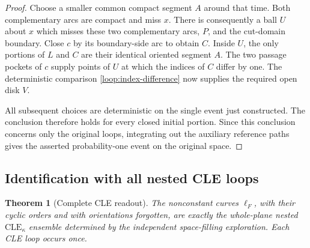 \documentclass[11pt]{article}
\numberwithin{equation}{section}
\newtheorem{theorem}{Theorem}[section]
\theoremstyle{definition}
\theoremstyle{remark}
\newcommand{\1}{\mathbf 1}
\begin{document}
\begin{proof}
Choose a smaller common compact segment $A$ around that time.  Both
complementary arcs are compact and miss $x$.  There is consequently a
ball $U$ about $x$ which misses these two complementary arcs, $P$, and
the cut-domain boundary.  Close $c$ by its boundary-side arc to obtain
$C$.  Inside $U$, the only portions of $L$ and $C$ are their identical
oriented segment $A$.  The two passage pockets of $c$ supply points
of $U$ at which the indices of $C$ differ by one.  The deterministic
comparison \eqref{loop:index-difference} now supplies the required
open disk $V$.

All subsequent choices are deterministic on the single event just
constructed.  The conclusion therefore holds for every closed initial
portion.  Since this conclusion concerns only the original loops,
integrating out the auxiliary reference paths gives the asserted
probability-one event on the original space.
\end{proof}

\subsection{Identification with all nested CLE loops}

\begin{theorem}[Complete CLE readout]\label{loop:readout}
The nonconstant curves $\ell_F$, with their cyclic orders and with
orientations forgotten, are exactly the whole-plane nested
$\mathrm{CLE}_{\kappa}$ ensemble determined by the independent
space-filling exploration.  Each CLE loop occurs once.
\end{theorem}
\end{document}
